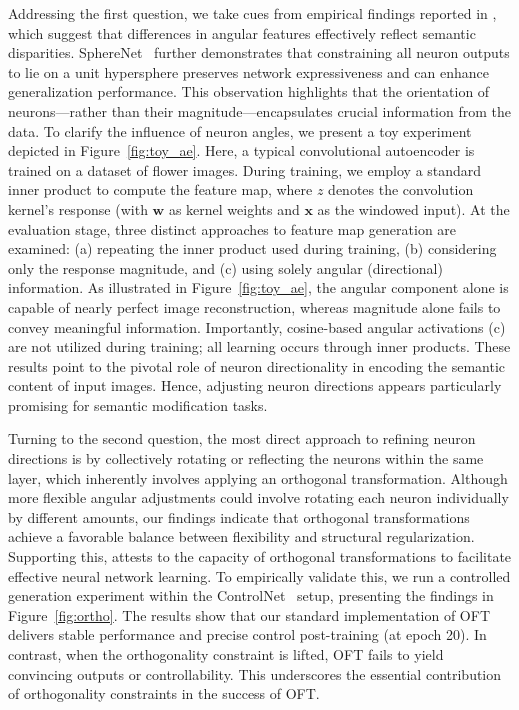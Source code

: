 Addressing the first question, we take cues from empirical findings reported in \cite{liu2018decoupled,chen2020angular}, which suggest that differences in angular features effectively reflect semantic disparities. SphereNet~\cite{liu2017deep} further demonstrates that constraining all neuron outputs to lie on a unit hypersphere preserves network expressiveness and can enhance generalization performance. This observation highlights that the orientation of neurons—rather than their magnitude—encapsulates crucial information from the data. To clarify the influence of neuron angles, we present a toy experiment depicted in Figure~\ref{fig:toy_ae}. Here, a typical convolutional autoencoder is trained on a dataset of flower images. During training, we employ a standard inner product to compute the feature map, where $z$ denotes the convolution kernel’s response (with $\bm{w}$ as kernel weights and $\bm{x}$ as the windowed input). At the evaluation stage, three distinct approaches to feature map generation are examined: (a) repeating the inner product used during training, (b) considering only the response magnitude, and (c) using solely angular (directional) information. As illustrated in Figure~\ref{fig:toy_ae}, the angular component alone is capable of nearly perfect image reconstruction, whereas magnitude alone fails to convey meaningful information. Importantly, cosine-based angular activations (c) are not utilized during training; all learning occurs through inner products. These results point to the pivotal role of neuron directionality in encoding the semantic content of input images. Hence, adjusting neuron directions appears particularly promising for semantic modification tasks.

Turning to the second question, the most direct approach to refining neuron directions is by collectively rotating or reflecting the neurons within the same layer, which inherently involves applying an orthogonal transformation. Although more flexible angular adjustments could involve rotating each neuron individually by different amounts, our findings indicate that orthogonal transformations achieve a favorable balance between flexibility and structural regularization. Supporting this, \cite{liu2021orthogonal} attests to the capacity of orthogonal transformations to facilitate effective neural network learning. To empirically validate this, we run a controlled generation experiment within the ControlNet~\cite{zhang2023adding} setup, presenting the findings in Figure~\ref{fig:ortho}. The results show that our standard implementation of OFT delivers stable performance and precise control post-training (at epoch 20). In contrast, when the orthogonality constraint is lifted, OFT fails to yield convincing outputs or controllability. This underscores the essential contribution of orthogonality constraints in the success of OFT.

